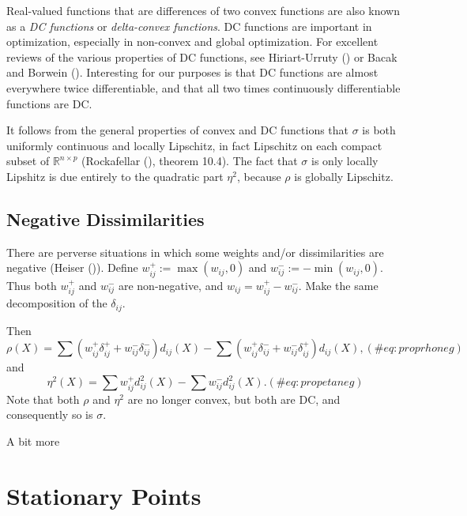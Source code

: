 \documentclass[
  12pt,
  letterpaper,
  DIV=11,
  numbers=noendperiod]{scrreprt}
\theoremstyle{remark}
\begin{document}
Real-valued functions that are differences of two convex functions are
also known as a \emph{DC functions} or \emph{delta-convex functions}. DC
functions are important in optimization, especially in non-convex and
global optimization. For excellent reviews of the various properties of
DC functions, see Hiriart-Urruty
() or Bacak and Borwein
(). Interesting for our purposes is
that DC functions are almost everywhere twice differentiable, and that
all two times continuously differentiable functions are DC.

It follows from the general properties of convex and DC functions that
\(\sigma\) is both uniformly continuous and locally Lipschitz, in fact
Lipschitz on each compact subset of \(\mathbb{R}^{n\times p}\)
(Rockafellar (), theorem 10.4). The
fact that \(\sigma\) is only locally Lipshitz is due entirely to the
quadratic part \(\eta^2\), because \(\rho\) is globally Lipschitz.

\subsection{Negative Dissimilarities}\label{propnegdis}

There are perverse situations in which some weights and/or
dissimilarities are negative (Heiser ()).
Define \(w_{ij}^+:=\max(w_{ij},0)\) and \(w_{ij}^-:=-\min(w_{ij},0)\).
Thus both \(w_{ij}^+\) and \(w_{ij}^-\) are non-negative, and
\(w_{ij}=w_{ij}^+-w_{ij}^-\). Make the same decomposition of the
\(\delta_{ij}\).

Then \begin{equation}
\rho(X)=\sum (w_{ij}^+\delta_{ij}^++w_{ij}^-\delta_{ij}^-)d_{ij}(X)-\sum(w_{ij}^+\delta_{ij}^-+w_{ij}^-\delta_{ij}^+)d_{ij}(X),
(\#eq:proprhoneg)
\end{equation} and \begin{equation}
\eta^2(X)=\sum w_{ij}^+d_{ij}^2(X)-\sum w_{ij}^-d_{ij}^2(X).
(\#eq:propetaneg)
\end{equation} Note that both \(\rho\) and \(\eta^2\) are no longer
convex, but both are DC, and consequently so is \(\sigma\).

A bit more

\section{Stationary Points}\label{propstationary}
\end{document}
